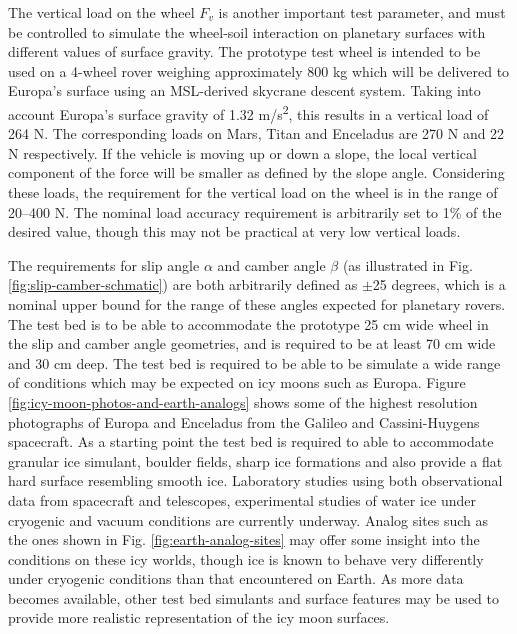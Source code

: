 \documentclass{article}
\begin{document}
The vertical load on the wheel $F_v$ is another important test parameter, and must be controlled to simulate the wheel-soil interaction on planetary surfaces with different values of surface gravity. The prototype test wheel is intended to be used on a 4-wheel rover weighing approximately 800 kg which will be delivered to Europa's surface using an MSL-derived skycrane descent system. Taking into account Europa's surface gravity of 1.32 m/s\textsuperscript{2}, this results in a vertical load of 264 N. The corresponding loads on Mars, Titan and Enceladus are 270 N and 22 N respectively. If the vehicle is moving up or down a slope, the local vertical component of the force will be smaller as defined by the slope angle.  Considering these loads, the requirement for the vertical load on the wheel is in the range of 20--400 N. The nominal  load accuracy requirement is arbitrarily set to 1\% of the desired value, though this may not be practical at very low vertical loads. 

The requirements for slip angle $\alpha$ and camber angle $\beta$ (as illustrated in Fig. \ref{fig:slip-camber-schmatic}) are both arbitrarily defined as $\pm$25 degrees, which is a nominal upper bound for the range of these angles expected for planetary rovers. The test bed is to be able to accommodate the prototype 25 cm wide wheel in the slip and camber angle geometries, and is required to be at least 70 cm wide and 30 cm deep. The test bed is required to be able to be simulate a wide range of conditions which may be expected on icy moons such as Europa. Figure \ref{fig:icy-moon-photos-and-earth-analogs} shows some of the highest resolution photographs of Europa and Enceladus from the Galileo and Cassini-Huygens spacecraft. As a starting point the test bed is required to able to accommodate granular ice simulant, boulder fields, sharp ice formations and also provide a flat hard surface resembling smooth ice. Laboratory studies using both observational data from spacecraft and telescopes, experimental studies of water ice under cryogenic and  vacuum conditions are currently underway. Analog sites such as the ones shown in Fig. \ref{fig:earth-analog-sites} may offer some insight into the conditions on these icy worlds, though ice is known to behave very differently under cryogenic conditions than that encountered on Earth.  As more data becomes available, other test bed simulants and surface features may be used to provide more realistic representation of the icy moon surfaces. 
\end{document}
